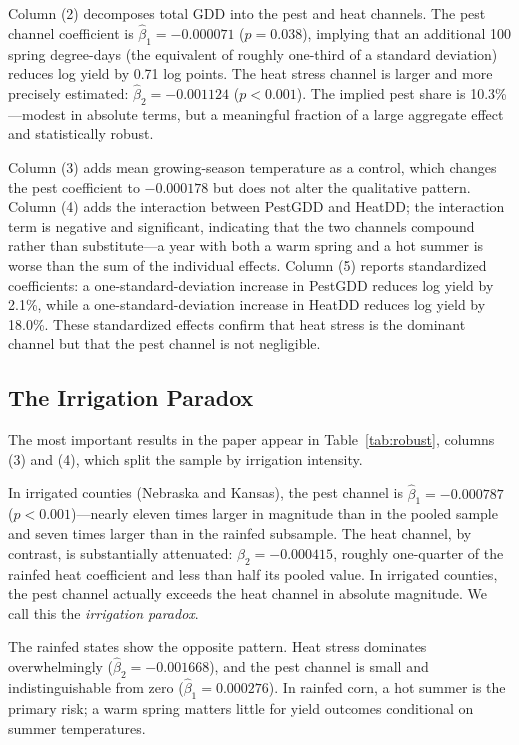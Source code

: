 \documentclass[12pt]{article}
\begin{document}


Column (2) decomposes total GDD into the pest and heat channels. The pest channel coefficient is $\hat{\beta}_1 = -0.000071$ ($p = 0.038$), implying that an additional 100 spring degree-days (the equivalent of roughly one-third of a standard deviation) reduces log yield by 0.71 log points. The heat stress channel is larger and more precisely estimated: $\hat{\beta}_2 = -0.001124$ ($p < 0.001$). The implied pest share is 10.3\%---modest in absolute terms, but a meaningful fraction of a large aggregate effect and statistically robust.

Column (3) adds mean growing-season temperature as a control, which changes the pest coefficient to $-0.000178$ but does not alter the qualitative pattern. Column (4) adds the interaction between PestGDD and HeatDD; the interaction term is negative and significant, indicating that the two channels compound rather than substitute---a year with both a warm spring and a hot summer is worse than the sum of the individual effects. Column (5) reports standardized coefficients: a one-standard-deviation increase in PestGDD reduces log yield by 2.1\%, while a one-standard-deviation increase in HeatDD reduces log yield by 18.0\%. These standardized effects confirm that heat stress is the dominant channel but that the pest channel is not negligible.

\subsection{The Irrigation Paradox}

The most important results in the paper appear in Table~\ref{tab:robust}, columns (3) and (4), which split the sample by irrigation intensity.



In irrigated counties (Nebraska and Kansas), the pest channel is $\hat{\beta}_1 = -0.000787$ ($p < 0.001$)---nearly eleven times larger in magnitude than in the pooled sample and seven times larger than in the rainfed subsample. The heat channel, by contrast, is substantially attenuated: $\hat{\beta}_2 = -0.000415$, roughly one-quarter of the rainfed heat coefficient and less than half its pooled value. In irrigated counties, the pest channel actually exceeds the heat channel in absolute magnitude. We call this the \textit{irrigation paradox}.

The rainfed states show the opposite pattern. Heat stress dominates overwhelmingly ($\hat{\beta}_2 = -0.001668$), and the pest channel is small and indistinguishable from zero ($\hat{\beta}_1 = 0.000276$). In rainfed corn, a hot summer is the primary risk; a warm spring matters little for yield outcomes conditional on summer temperatures.
\end{document}

